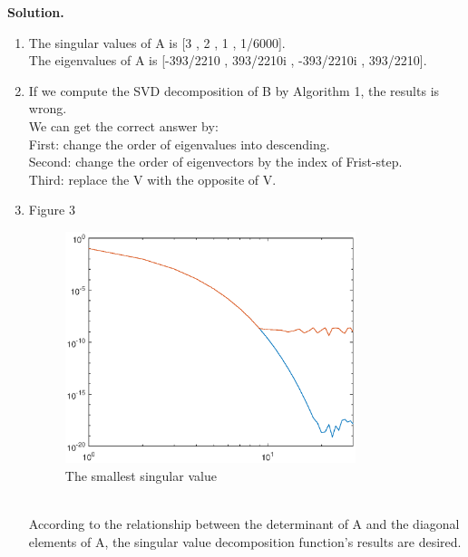 \documentclass[english,onecolumn]{IEEEtran}
\begin{document}
\noindent
\textbf{Solution.}
\begin{enumerate}
		\item 
		The singular values of A is [3 , 2 , 1 , 1/6000].\\
		The eigenvalues of A is [-393/2210 , 393/2210i , -393/2210i , 393/2210].\\
		\item
		If we compute the SVD decomposition of B by Algorithm 1, the results is wrong.\\
		We can get the correct answer by:\\
			First: change the order of eigenvalues into descending.\\
			Second: change the order of eigenvectors by the index of Frist-step.\\
			Third: replace the V with the opposite of V.\\
		\item Figure 3
			\begin{figure}[htbp]
				\centering
				\includegraphics[width=0.8\textwidth]{fig2_3.eps}
				\caption{The smallest singular value}
			\end{figure}\\
			According to the relationship between the determinant of A and the diagonal elements of A, the singular value decomposition function's results are desired.\\
		
\end{enumerate}


\clearpage
\newpage
\end{document}
